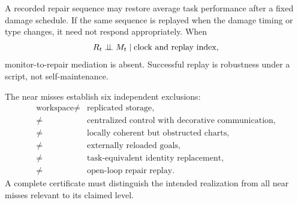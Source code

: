 
A recorded repair sequence may restore average task performance after a fixed
damage schedule. If the same sequence is replayed when the damage timing or
type changes, it need not respond appropriately. When
\[
R_t\perp\!\!\!\perp M_t\mid\text{clock and replay index},
\]
monitor-to-repair mediation is absent. Successful replay is robustness under a
script, not self-maintenance.


The near misses establish six independent exclusions:
\[
\boxed{
\begin{aligned}
\text{workspace}
\neq{}&\text{replicated storage},\\
\neq{}&\text{centralized control with decorative communication},\\
\neq{}&\text{locally coherent but obstructed charts},\\
\neq{}&\text{externally reloaded goals},\\
\neq{}&\text{task-equivalent identity replacement},\\
\neq{}&\text{open-loop repair replay}.
\end{aligned}
}
\]
A complete certificate must distinguish the intended realization from all
near misses relevant to its claimed level.



